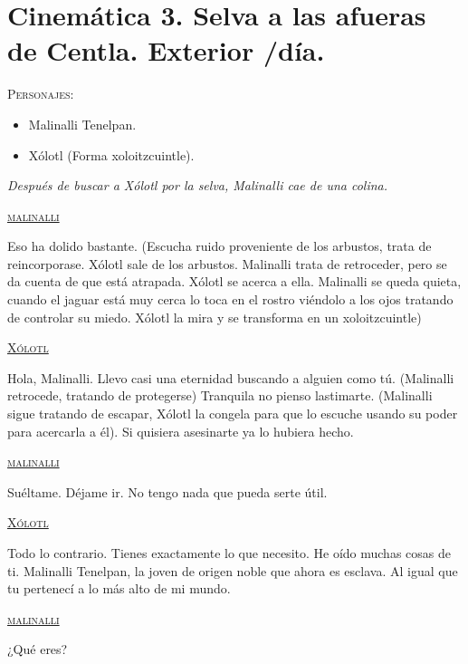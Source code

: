 \documentclass[11pt,letterpaper]{article}
\begin{document}
\section{Cinemática 3. Selva a las afueras de Centla. Exterior /día.}
\textsc{Personajes}:
\begin{itemize}
	\item Malinalli Tenelpan.
	\item Xólotl (Forma xoloitzcuintle).
\end{itemize}
\textit{Después de buscar a Xólotl por la selva, Malinalli cae de una colina.}
\begin{center}
	\textsc{\underline{malinalli}}
	\\	
	\par
Eso ha dolido bastante.
(Escucha ruido proveniente de los arbustos, trata de reincorporase. Xólotl sale de los arbustos. Malinalli trata de retroceder, pero se da cuenta de que está atrapada. Xólotl se acerca a ella. Malinalli se queda quieta, cuando el jaguar está muy cerca lo toca en el rostro viéndolo a los ojos tratando de controlar su miedo. Xólotl la mira y se transforma en un xoloitzcuintle)
\\	
	\par
\textsc{\underline{Xólotl}}
\\	
	\par
Hola, Malinalli. Llevo casi una eternidad buscando a alguien como tú.
(Malinalli retrocede, tratando de protegerse)
Tranquila no pienso lastimarte.
(Malinalli sigue tratando de escapar, Xólotl la congela para que lo escuche usando su poder para acercarla a él).
Si quisiera asesinarte ya lo hubiera hecho.
\\	
	\par
\textsc{\underline{malinalli}}
\\	
	\par
Suéltame. Déjame ir. No tengo nada que pueda serte útil.
\\	
	\par
\textsc{\underline{Xólotl}}
\\	
	\par
Todo lo contrario. Tienes exactamente lo que necesito. He oído muchas cosas de ti. Malinalli Tenelpan, la joven de origen noble que ahora es esclava. Al igual que tu pertenecí a lo más alto de mi mundo.
\\	
	\par
\textsc{\underline{malinalli}}
\\	
	\par
¿Qué eres?
\\	

\end{center}
\end{document}
